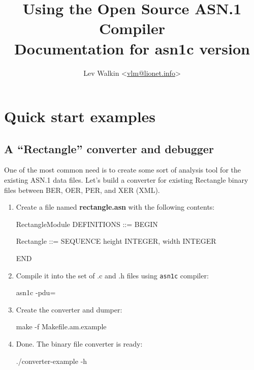 \documentclass[english,oneside,12pt]{book}
\newcommand{\cmd}[1]{\texttt{#1}}
\begin{document}
\title{Using the Open Source ASN.1 Compiler\\
\vspace*{0.4cm}
\Large Documentation for asn1c version \asnver{}}
\author{Lev Walkin <\href{mailto:vlm@lionet.info?Subject=asn1c}{vlm@lionet.info}>}

\pagestyle{fancy}
\fancyhead[L]{\leftmark}
\maketitle

\tableofcontents{}

\chapter{\label{chap:Quick-start-examples}Quick start examples}

\section{A “Rectangle” converter and debugger}

One of the most common need is to create some sort of analysis tool
for the existing ASN.1 data files. Let's build a converter for existing
Rectangle binary files between BER, OER, PER, and XER (XML).

\begin{enumerate}
\item Create a file named \textbf{rectangle.asn} with the following contents:
\begin{asn}
RectangleModule DEFINITIONS ::= BEGIN

Rectangle ::= SEQUENCE {
    height  INTEGER,
    width   INTEGER
}

END
\end{asn}

\item Compile it into the set of .c and .h files using \cmd{asn1c} compiler:

\begin{bash}
asn1c -pdu=%
\end{bash}

\item Create the converter and dumper:

\begin{bash}
make -f Makefile.am.example
\end{bash}

\item Done. The binary file converter is ready:

\begin{bash}
./converter-example -h
\end{bash}
\end{enumerate}
\end{document}
